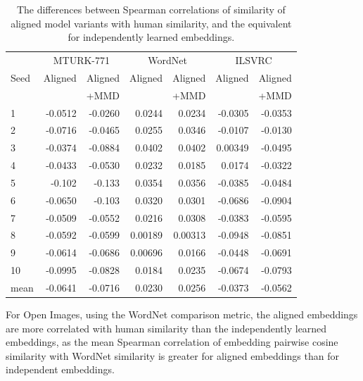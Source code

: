 \begin{table}[H]
\begin{tabular}{lrrrrrr}
\multicolumn{1}{r}{} & \multicolumn{2}{c}{MTURK-771} & \multicolumn{2}{c}{WordNet} & \multicolumn{2}{c}{ILSVRC} \\
\cmidrule(lr){2-3} \cmidrule(lr){4-5} \cmidrule(lr){6-7}
{Seed} &   Aligned   &  Aligned  &   Aligned &  Aligned  &  Aligned &  Aligned   \\
{}     &             & +MMD      &            & +MMD     &          &   +MMD     \\
\midrule
1    &     -0.0512 &    -0.0260  &   0.0244 &     0.0234 &    -0.0305 &    -0.0353   \\
2    &     -0.0716 &    -0.0465  &   0.0255 &     0.0346 &    -0.0107 &    -0.0130   \\
3    &     -0.0374 &    -0.0884  &   0.0402 &     0.0402 &     0.00349 &    -0.0495   \\
4    &     -0.0433 &    -0.0530  &   0.0232 &     0.0185 &     0.0174 &    -0.0322   \\
5    &     -0.102  &    -0.133   &   0.0354 &     0.0356 &    -0.0385 &    -0.0484   \\
6    &     -0.0650 &    -0.103   &   0.0320 &     0.0301 &    -0.0686 &    -0.0904   \\
7    &     -0.0509 &    -0.0552  &   0.0216 &     0.0308 &    -0.0383 &    -0.0595   \\
8    &     -0.0592 &    -0.0599  &   0.00189 &    0.00313 &   -0.0948 &    -0.0851   \\
9    &     -0.0614 &    -0.0686  &   0.00696 &    0.0166 &    -0.0448 &    -0.0691   \\
10   &     -0.0995 &    -0.0828  &   0.0184 &     0.0235 &    -0.0674 &    -0.0793   \\
\midrule                                                                                          
mean &     -0.0641 &    -0.0716  &   0.0230 &     0.0256 &    -0.0373 &    -0.0562   \\
\bottomrule
\end{tabular}
\caption{The differences between Spearman correlations of similarity of aligned model variants with human similarity, and the equivalent for independently learned embeddings.}
\end{table}

For Open Images, using the WordNet comparison metric, the aligned embeddings are more correlated with human similarity than the independently learned embeddings, as the mean Spearman correlation of embedding pairwise cosine similarity with WordNet similarity is greater for aligned embeddings than for independent embeddings. 

